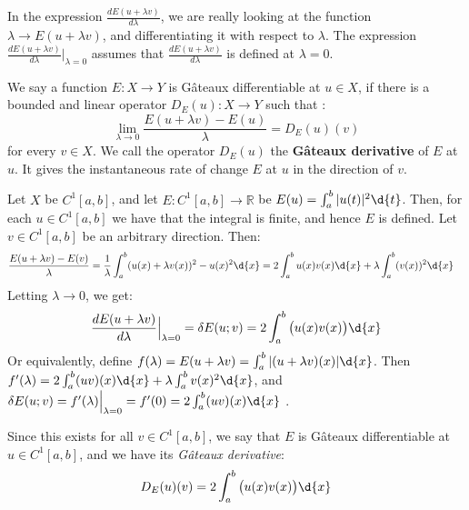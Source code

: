 \documentclass{article}
\begin{document}
\begin{remark} In the expression $\frac{d E(u + \lambda v)}{d \lambda}$, we are really looking at the function $\lambda \to E(u+ \lambda v)$, and differentiating it with respect to $\lambda$. The expression $\frac{d E(u+\lambda v)}{d \lambda} \Big|_{\lambda = 0}$ assumes that $\frac{d E(u + \lambda v)}{d \lambda}$ is defined at $\lambda = 0$. 

\end{remark}

\begin{theorem}
\end{theorem}

\begin{definition}  We say a function $E: X \to Y$ is Gâteaux differentiable at $u \in X$, if there is a bounded and linear operator $D_{E}(u) : X \to Y$ such that :
\[
  \lim_{\lambda \to 0} \frac{ E(u+ \lambda v) - E(u) }{\lambda} = D_{E}(u)(v)
\]
for every $v \in X$. We call the operator $D_{E}(u)$ the \textbf{Gâteaux derivative} of $E$ at $u$. It gives the instantaneous rate of change $E$ at $u$ in the direction of $v$. 
\end{definition}


\begin{example} \label{eg:l2NormFunctional} Let $X$ be $C^{1}[a,b]$, and let $E: C^{1}[a,b] \to \mathbb{R}$ be  $E(u) = \int_{a}^{b} |u(t)| ^2 \d{t}$. Then, for each $u \in C^{1}[a,b]$ we have that the integral is finite, and hence $E$ is defined. Let $v \in C^{1}[a,b]$ be an arbitrary direction. Then:
\begin{align*}
 \frac{E(u+\lambda v)-E(v)}{\lambda} &= \frac{1}{\lambda} \int_{a}^{b}  (u(x) +\lambda v(x) ) ^2 - u(x) ^2 \d{x}  = 2 \int_{a}^{b} u(x) v(x) \d{x} + \lambda \int_{a}^{b} (v(x)) ^2 \d{x} 
\end{align*}
Letting $\lambda \to 0$,  we get:
\[
  \frac{d E(u+\lambda v)}{d \lambda} \Big|_{\lambda = 0} = \delta E(u ; v) =  2 \int_{a}^{b} \big( u(x) v(x) \big) \d{x}
\]
Or equivalently, define $f(\lambda) = E(u + \lambda v) = \int_{a}^{b} | (u + \lambda v)(x) |  \d{x}$. Then $f'(\lambda) = 2 \int_{a}^{b} (u v)(x) \d{x} + \lambda \int_{a}^{b} v(x) ^2 \d{x}$, and $\delta E(u ; v) = f'( \lambda) \Big|_{\lambda = 0} = f'(0) = 2 \int_{a}^{b} (uv) (x) \d{x}$ .

Since this exists for all $v \in C^{1}[a,b]$, we say that $E$ is Gâteaux differentiable at $u \in C^{1}[a,b]$, and we have its \textit{Gâteaux derivative}:
\[
  D_{E}(u) (v) = 2 \int_{a}^{b} \big( u(x) v(x)  \big) \d{x}
\]
\end{example}
\end{document}
